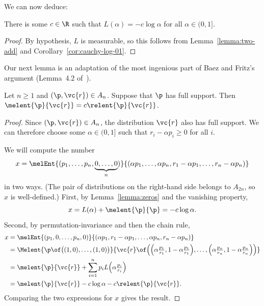 We can now deduce:

\begin{lemma}
There is some $c \in \R$ such that $L(\alpha) = -c\log\alpha$ for all
$\alpha \in (0, 1]$.
\end{lemma}

\begin{proof}
By hypothesis, $L$ is measurable, so this follows from
Lemma~\ref{lemma:two-add} and Corollary~\ref{cor:cauchy-log-01}.
\end{proof}

Our next lemma is an adaptation of the most ingenious part of Baez and
Fritz's argument (Lemma~4.2 of~\cite{BaFr}).

\begin{lemma}
Let $n \geq 1$ and $(\p, \vc{r}) \in A_n$.  Suppose that $\p$ has full
support.  Then $\melent{\p}{\vc{r}} = c\relent{\p}{\vc{r}}$.
\end{lemma}

\begin{proof}
Since $(\p, \vc{r}) \in A_n$, the distribution $\vc{r}$ also has full
support.  We can therefore choose some $\alpha \in (0, 1]$ such that $r_i -
  \alpha p_i \geq 0$ for all $i$.

We will compute the number
\[
x =
\melEnt{(p_1, \ldots, p_n, \underbrace{0, \ldots, 0}_n)}
{(\alpha p_1, \ldots, \alpha p_n, 
r_1 - \alpha p_1, \ldots, r_n - \alpha p_n)} 
\]
in two ways.  (The pair of distributions on the right-hand side belongs to
$A_{2n}$, so $x$ is well-defined.)  First, by Lemma~\ref{lemma:zeros}
and the vanishing property,
\[
x 
=
L(\alpha) + \melent{\p}{\p}
=
-c\log\alpha.
\]
Second, by permutation-invariance and then the chain rule,
% 
\begin{align*}
x       &
=
\melEnt{(p_1, 0, \ldots, p_n, 0)}
{(\alpha p_1, r_1 - \alpha p_1, \ldots, \alpha p_n, r_n - \alpha p_n)} \\
&
=
\Melent{\p \of \bigl((1, 0), \ldots, (1, 0)\bigr)}
{\vc{r} \of 
\Bigl(
\Bigl(\alpha \tfrac{p_1}{r_1}, 1 - \alpha \tfrac{p_1}{r_1}\Bigr), \ldots, 
\Bigl(\alpha \tfrac{p_n}{r_n}, 1 - \alpha \tfrac{p_n}{r_n}\Bigr)
\Bigr)} \\
&
=
\melent{\p}{\vc{r}} + 
\sum_{i = 1}^n p_i L\Bigl(\alpha \tfrac{p_i}{r_i}\Bigr) \\
&
=
\melent{\p}{\vc{r}} - c\log \alpha - c\relent{\p}{\vc{r}}.
\end{align*}
% 
Comparing the two expressions for $x$ gives the result.
\end{proof}


